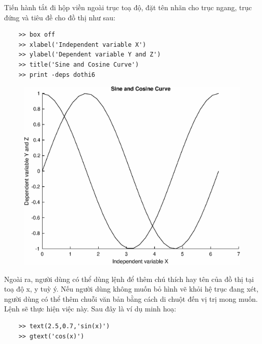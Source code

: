 \documentclass[12pt,a4paper]{article}
\begin{document}
Tiến hành tắt đi hộp viền ngoài trục toạ độ, đặt tên nhãn cho trục ngang, trục đứng và tiêu đề cho đồ thị như sau:
\begin{lstlisting}
	>> box off
	>> xlabel('Independent variable X')
	>> ylabel('Dependent variable Y and Z')
	>> title('Sine and Cosine Curve')
	>> print -deps dothi6
\end{lstlisting}
\begin{center}
	\begin{figure}[H]
	\begin{center}
		\includegraphics[scale=0.6]{hinhtieuluan/dothi6}
	\end{center}
		\caption{}
		\label{refdothi6}
	\end{figure}
\end{center}
Ngoài ra, người dùng có thể dùng lệnh  để thêm chú thích hay tên của đồ thị tại toạ độ x, y tuỳ ý. Nếu người dùng không muốn bỏ hình vẽ khỏi hệ trục đang xét, người dùng có thể thêm chuỗi văn bản bằng cách di chuột đến vị trị mong muốn. Lệnh  sẽ thực hiện việc này. Sau đây là ví dụ minh hoạ:
\begin{lstlisting}
	>> text(2.5,0.7,'sin(x)')
	>> gtext('cos(x)')
\end{lstlisting}
\end{document}
